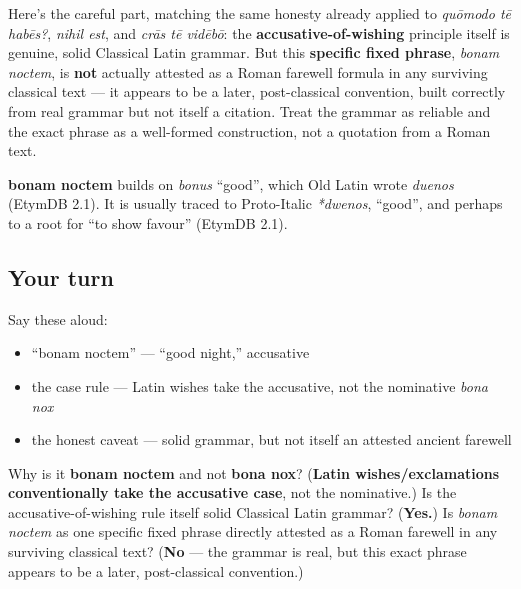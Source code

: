 \begin{grammarlens}[title={Grammar Lens: Be honest: real grammar, not a real citation}]
Here's the careful part, matching the same honesty already applied to \emph{quōmodo tē habēs?}, \emph{nihil est}, and \emph{crās tē vidēbō}: the \textbf{accusative-of-wishing} principle itself is genuine, solid Classical Latin grammar. But this \textbf{specific fixed phrase}, \emph{bonam noctem}, is \textbf{not} actually attested as a Roman farewell formula in any surviving classical text — it appears to be a later, post-classical convention, built correctly from real grammar but not itself a citation. Treat the grammar as reliable and the exact phrase as a well-formed construction, not a quotation from a Roman text.
\end{grammarlens}

\begin{cousinweb}
\textbf{bonam noctem} builds on \emph{bonus} \textquotedblleft{}good\textquotedblright{}, which Old Latin wrote \emph{duenos} (EtymDB 2.1). It is usually traced to Proto-Italic \emph{*dwenos}, \textquotedblleft{}good\textquotedblright{}, and perhaps to a root for \textquotedblleft{}to show favour\textquotedblright{} (EtymDB 2.1).
\end{cousinweb}

\subsection*{Your turn}
Say these aloud:

\begin{itemize}
\raggedright
  \item \textquotedblleft{}bonam noctem\textquotedblright{} — \textquotedblleft{}good night,\textquotedblright{} accusative
  \item the case rule — Latin wishes take the accusative, not the nominative \emph{bona nox}
  \item the honest caveat — solid grammar, but not itself an attested ancient farewell
\end{itemize}

\begin{tcolorbox}[breakable,colback=teal!4,colframe=teal!35!black,title={Before you move on}]
Why is it \textbf{bonam noctem} and not \textbf{bona nox}? (\textbf{Latin wishes/exclamations conventionally take the accusative case}, not the nominative.) Is the accusative-of-wishing rule itself solid Classical Latin grammar? (\textbf{Yes.}) Is \emph{bonam noctem} as one specific fixed phrase directly attested as a Roman farewell in any surviving classical text? (\textbf{No} — the grammar is real, but this exact phrase appears to be a later, post-classical convention.)
\end{tcolorbox}

